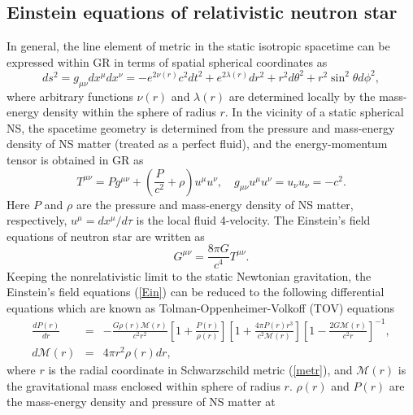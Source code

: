 \subsection{Einstein equations of relativistic neutron star}%
\label{sec3.1}
In general, the line element of metric in the static isotropic spacetime can be 
expressed within GR  \citep{oppenheimer1939massive} in terms of spatial spherical 
coordinates as
\begin{equation}
        ds^2 = g_{\mu\nu}dx^\mu dx^\nu= - e^{2\nu(r)}c^2dt^2 + e^{2\lambda(r)}dr^2 + 
				r^2 d\theta^2 + r^2\sin^2\theta d\phi^2, \label{metr}
\end{equation}
where arbitrary functions $\nu(r)$ and $\lambda(r)$ are determined locally by the
mass-energy density within the sphere of radius $r$. In the vicinity of a 
static spherical NS, the spacetime geometry is determined from the pressure and 
mass-energy density of NS matter (treated as a perfect fluid), and the  
energy-momentum tensor is obtained in \gls{GR} as
\begin{equation}
        T^{\mu\nu}= Pg^{\mu\nu} + \left( \frac{P}{c^2} +\rho \right) u^\mu u^\nu,\quad
				g_{\mu\nu}u^\mu u^\nu=u_\nu u_\nu=-c^2.
\end{equation}
Here $P$ and $\rho$ are the pressure and mass-energy density of NS matter, respectively,
$u^\mu = dx^\mu/d\tau$ is the local fluid 4-velocity. The Einstein's field 
equations of neutron star are written as 
\begin{equation}
        G^{\mu\nu} = \frac{8\pi G}{c^4} T^{\mu\nu}. \label{Ein} 
\end{equation}
Keeping the nonrelativistic limit to the static Newtonian gravitation, the 
Einstein's field equations (\ref{Ein}) can be reduced to the following differential 
equations which are known as Tolman-Oppenheimer-Volkoff (\gls{TOV}) equations 
\citep{oppenheimer1939massive}
\begin{eqnarray}
\frac{d P(r)}{dr}&=& -\frac{G \rho(r)\mathcal{M}(r)}{c^2 r^2} 
 \left[ 1+\frac{P(r)}{\rho(r)}\right] 
\left[1+\frac{4 \pi P(r) r^3}{c^2 \mathcal{M}(r)} \right] 
\left[ 1-\frac{2G \mathcal{M}(r)}{c^2 r} \right]^{-1}, \nonumber \\
d\mathcal{M}(r) &=& 4\pi r^2 \rho(r)dr, \label{tov} 
\end{eqnarray}
where $r$ is the radial coordinate in Schwarzschild metric (\ref{metr}), and 
$\mathcal{M}(r)$ is the gravitational mass enclosed within sphere of radius $r$. 
$\rho(r)$ and $P(r)$ are the mass-energy density and pressure of NS matter at 
